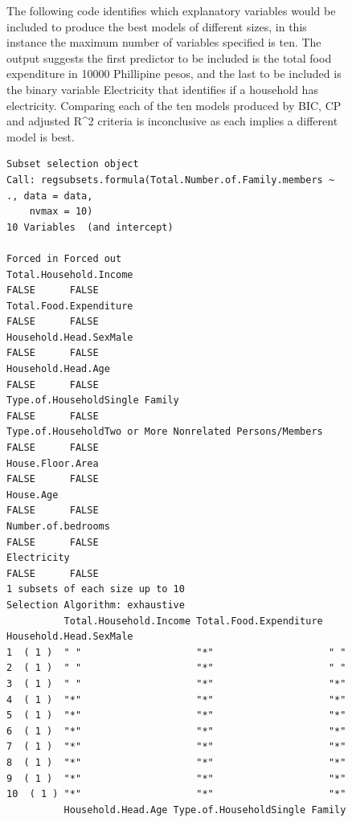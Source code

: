 \documentclass[
]{article}
\begin{document}
\begin{figure}[H]
The following code identifies which explanatory variables would be
included to produce the best models of different sizes, in this instance
the maximum number of variables specified is ten. The output suggests
the first predictor to be included is the total food expenditure in
10000 Phillipine pesos, and the last to be included is the binary
variable Electricity that identifies if a household has electricity.
Comparing each of the ten models produced by BIC, CP and adjusted R\^{}2
criteria is inconclusive as each implies a different model is best.

\begin{verbatim}
Subset selection object
Call: regsubsets.formula(Total.Number.of.Family.members ~ ., data = data, 
    nvmax = 10)
10 Variables  (and intercept)
                                                        Forced in Forced out
Total.Household.Income                                      FALSE      FALSE
Total.Food.Expenditure                                      FALSE      FALSE
Household.Head.SexMale                                      FALSE      FALSE
Household.Head.Age                                          FALSE      FALSE
Type.of.HouseholdSingle Family                              FALSE      FALSE
Type.of.HouseholdTwo or More Nonrelated Persons/Members     FALSE      FALSE
House.Floor.Area                                            FALSE      FALSE
House.Age                                                   FALSE      FALSE
Number.of.bedrooms                                          FALSE      FALSE
Electricity                                                 FALSE      FALSE
1 subsets of each size up to 10
Selection Algorithm: exhaustive
          Total.Household.Income Total.Food.Expenditure Household.Head.SexMale
1  ( 1 )  " "                    "*"                    " "                   
2  ( 1 )  " "                    "*"                    " "                   
3  ( 1 )  " "                    "*"                    "*"                   
4  ( 1 )  "*"                    "*"                    "*"                   
5  ( 1 )  "*"                    "*"                    "*"                   
6  ( 1 )  "*"                    "*"                    "*"                   
7  ( 1 )  "*"                    "*"                    "*"                   
8  ( 1 )  "*"                    "*"                    "*"                   
9  ( 1 )  "*"                    "*"                    "*"                   
10  ( 1 ) "*"                    "*"                    "*"                   
          Household.Head.Age Type.of.HouseholdSingle Family

\end{verbatim}
\end{figure}
\end{document}
